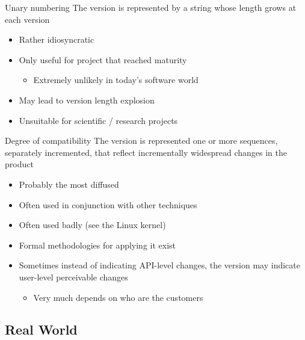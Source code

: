 \documentclass[presentation]{beamer}
\begin{document}
\begin{frame}{Unary numbering}
    The version is represented by a string whose length grows at each version
    \begin{itemize}
        \item Rather idiosyncratic
        \item Only useful for project that reached maturity
        \begin{itemize}
            \item Extremely unlikely in today's software world
        \end{itemize}
        \item May lead to version length explosion
        \item Unsuitable for scientific / research projects
    \end{itemize}
\end{frame}

\begin{frame}{Degree of compatibility}
    The version is represented one or more sequences, separately incremented, that reflect incrementally widespread changes in the product
    \begin{itemize}
        \item Probably the most diffused
        \item Often used in conjunction with other techniques
        \item Often used badly (see the Linux kernel)
        \item Formal methodologies for applying it exist
        \item Sometimes instead of indicating API-level changes, the version may indicate user-level perceivable changes
        \begin{itemize}
            \item Very much depends on who are the customers
        \end{itemize}
    \end{itemize}
\end{frame}

\subsection{Real World}
\end{document}
